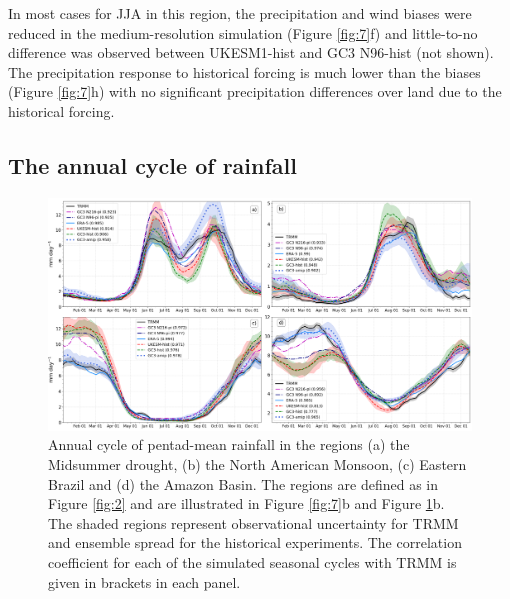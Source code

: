 In most cases for JJA in this region, the precipitation and wind biases were reduced in the medium-resolution simulation (Figure \ref{fig:7}f) and little-to-no difference was observed between UKESM1-hist and GC3 N96-hist (not shown).
The precipitation response to historical forcing is much lower than the biases (Figure \ref{fig:7}h) with no significant precipitation differences over land due to the historical forcing. %
 

\subsection{The annual cycle of rainfall}\label{sq:raincycle}

\begin{figure}[b!]
\centering
 \includegraphics[width=1.0\linewidth]{figures/amipseasonalcycle.png}
\caption[Annual cycle of precipitation in different regions of the AMS]{Annual cycle of pentad-mean rainfall in the regions (a) the Midsummer drought, (b) the North American Monsoon, (c) Eastern Brazil and (d) the Amazon Basin. The regions are defined as in Figure \ref{fig:2} and are illustrated in Figure \ref{fig:7}b and Figure \ref{fig:8}b. The shaded regions represent observational uncertainty for TRMM and ensemble spread for the historical experiments. The correlation coefficient for each of the simulated seasonal cycles with TRMM is given in brackets in each panel.  }
\label{fig:8}
\end{figure}


